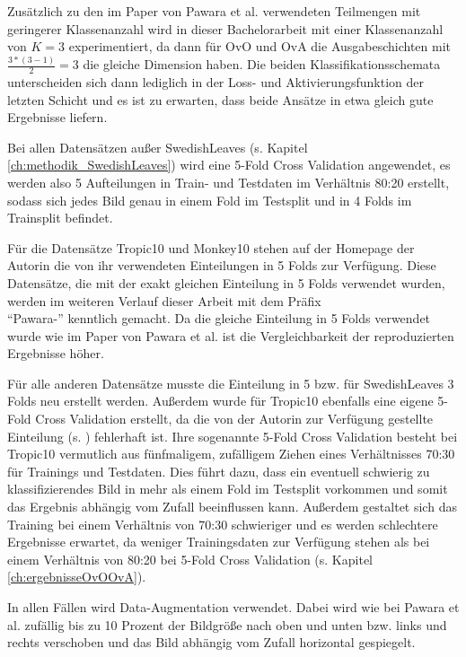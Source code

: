 Zusätzlich zu den im Paper von Pawara et al. \cite{pawaraPaper} verwendeten Teilmengen mit geringerer Klassenanzahl wird in dieser Bachelorarbeit mit einer Klassenanzahl von $K=3$ experimentiert, da dann für OvO und OvA die Ausgabeschichten mit $\frac{3*(3-1)}{2} = 3$ die gleiche Dimension haben. Die beiden Klassifikationsschemata unterscheiden sich dann lediglich in der Loss- und Aktivierungsfunktion der letzten Schicht und es ist zu erwarten, dass beide Ansätze in etwa gleich gute Ergebnisse liefern.

Bei allen Datensätzen außer SwedishLeaves (s. Kapitel \ref{ch:methodik_SwedishLeaves}) wird eine 5-Fold Cross Validation angewendet, es werden also 5 Aufteilungen in Train- und Testdaten im Verhältnis 80:20 erstellt, sodass sich jedes Bild genau in einem Fold im Testsplit und in 4 Folds im Trainsplit befindet.

Für die Datensätze Tropic10 und Monkey10 stehen auf der Homepage der Autorin \cite{pawaraWebsiteDatensaetze} die von ihr verwendeten Einteilungen in 5 Folds zur Verfügung. Diese Datensätze, die mit der exakt gleichen Einteilung in 5 Folds verwendet wurden, werden im weiteren Verlauf dieser Arbeit mit dem Präfix\\ \enquote{Pawara-} kenntlich gemacht. Da die gleiche Einteilung in 5 Folds verwendet wurde wie im Paper von Pawara et al. \cite{pawaraPaper} ist die Vergleichbarkeit der reproduzierten Ergebnisse höher.

Für alle anderen Datensätze musste die Einteilung in 5 bzw. für SwedishLeaves 3 Folds neu erstellt werden.
Außerdem wurde für Tropic10 ebenfalls eine eigene 5-Fold Cross Validation erstellt, da die von der Autorin zur Verfügung gestellte Einteilung (s. \cite{pawaraWebsiteDatensaetze}) fehlerhaft ist. Ihre sogenannte 5-Fold Cross Validation besteht bei Tropic10 vermutlich aus fünfmaligem, zufälligem Ziehen eines Verhältnisses 70:30 für Trainings und Testdaten. Dies führt dazu, dass ein eventuell schwierig zu klassifizierendes Bild in mehr als einem Fold im Testsplit vorkommen und somit das Ergebnis abhängig vom Zufall beeinflussen kann. Außerdem gestaltet sich das Training bei einem Verhältnis von 70:30 schwieriger und es werden schlechtere Ergebnisse erwartet, da weniger Trainingsdaten zur Verfügung stehen als bei einem Verhältnis von 80:20 bei 5-Fold Cross Validation (s. Kapitel \ref{ch:ergebnisseOvOOvA}).


In allen Fällen wird Data-Augmentation verwendet. Dabei wird wie bei Pawara et al. \cite{pawaraPaper, pawaraWebsiteCode} zufällig bis zu 10 Prozent der Bildgröße nach oben und unten bzw. links und rechts verschoben und das Bild abhängig vom Zufall horizontal gespiegelt.

